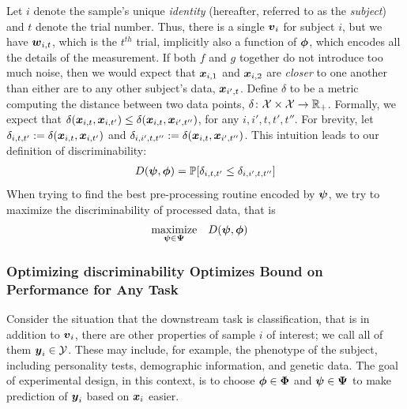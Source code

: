 \documentclass{article}
\begin{document}
Let $i$ denote the sample's unique \emph{identity} (hereafter, referred to as the \emph{subject}) and $t$ denote the trial number.  Thus, there is a single $\boldsymbol{v}_i$ for subject $i$, but we have $\boldsymbol{w}_{i,t}$, which is the $t^{th}$ trial, implicitly also a function of $\boldsymbol{\phi}$, which encodes all the details of the measurement. If both $f$ and $g$ together do not introduce too much noise, then we would expect that $\boldsymbol{x}_{i,1}$ and $\boldsymbol{x}_{i,2}$ are \emph{closer} to one another than either are to any other subject's data, $\boldsymbol{x}_{i',t}$.  Define $\delta$ to be a metric computing the distance between two data points, $\delta {\ensuremath{\colon}} \mathcal{X} \times \mathcal{X} \to \mathbb{R}_+$.  Formally, we expect that $\delta(\boldsymbol{x}_{i,t},\boldsymbol{x}_{i,t'}) \leq \delta(\boldsymbol{x}_{i,t},\boldsymbol{x}_{i',t''})$, for any $i,i',t,t',t''$.  
For brevity, let $\delta_{i,t,t'}:=\delta(\boldsymbol{x}_{i,t}, \boldsymbol{x}_{i,t'})$ and 
$\delta_{i,i',t,t''}:=\delta(\boldsymbol{x}_{i,t}, \boldsymbol{x}_{i',t''})$.  
This intuition leads to our definition of discriminability:
\begin{align}
D(\boldsymbol{\psi},\boldsymbol{\phi}) = \mathbb{P}[ \delta_{i,t,t'} \leq \delta_{i,i',t,t''}]
\end{align}
When trying to find the best pre-processing routine encoded by $\boldsymbol{\psi}$, we try to maximize the discriminability of processed data, that is 
\begin{equation} 
\begin{aligned}
& \underset{\boldsymbol{\psi} \in \boldsymbol{\Psi}}{\text{maximize}}
& & D(\boldsymbol{\psi},\boldsymbol{\phi})
\end{aligned}
\end{equation}


\subsubsection{Optimizing discriminability Optimizes Bound on Performance for Any Task}

Consider the situation that the downstream task is classification, that is in addition to $\boldsymbol{v}_i$, there are other properties of sample $i$ of interest; we call all of them $\boldsymbol{y}_i \in \mathcal{Y}$.  These may include, for example, the phenotype of the subject, including personality tests, demographic information, and genetic data. The goal of experimental design, in this context, is to choose $\boldsymbol{\phi} \in \boldsymbol{\Phi}$ and $\boldsymbol{\psi} \in \boldsymbol{\Psi}$ to make prediction of $\boldsymbol{y}_i$ based on $\boldsymbol{x}_i$ easier. 
\end{document}
